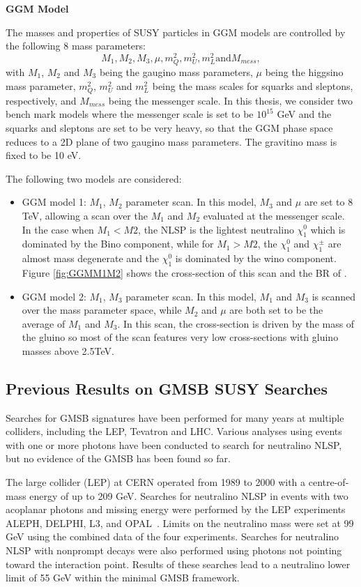 \documentclass[thesis.tex]{subfiles}
\begin{document}
\noindent \textbf{GGM Model}

The masses and properties of SUSY particles in GGM models are controlled by the following 8 mass parameters:
	\begin{equation}
		M_1, M_2, M_3, \mu, m_Q^2, m_U^2, m_L^2 \text{and} M_{mess},
	\end{equation}
with $M_1$, $M_2$ and $M_3$ being the gaugino mass parameters, $\mu$ being the higgsino mass parameter, $m_Q^2$, $m_U^2$ and $m_L^2$ being the mass scales for squarks and sleptons, respectively, and $M_{mess}$ being the messenger scale. 
In this thesis, we consider two bench mark models where the messenger scale is set to be $10^{15}$ GeV and the squarks and sleptons are set to be very heavy, so that the GGM phase space reduces to a 2D plane of two gaugino mass parameters.
The gravitino mass is fixed to be 10 eV.

The following two models are considered:
	\begin{itemize}
		\item GGM model 1: $M_1$, $M_2$ parameter scan. In this model, $M_3$ and $\mu$ are set to 8 TeV, allowing a scan over the $M_1$ and $M_2$ evaluated at the messenger scale. In the case when $M_1 < M2$, the NLSP is the lightest neutralino $\chi_1^0$ which is dominated by the Bino component, while for $M_1 > M2$, the $\chi_1^0$ and $\chi_1^\pm$ are almost mass degenerate and the $\chi_1^0$ is dominated by the wino component. Figure \ref{fig:GGMM1M2} shows the cross-section of this scan and the BR of . 
		\item GGM model 2: $M_1$, $M_3$ parameter scan. In this model, $M_1$ and $M_3$ is scanned over the mass parameter space, while $M_2$ and $\mu$ are both set to be the average of $M_1$ and $M_3$. In this scan, the cross-section is driven by the mass of the gluino so most of the scan features very low cross-sections with gluino masses above 2.5TeV. 
	\end{itemize}

\subsection{Previous Results on GMSB SUSY Searches}
Searches for GMSB signatures have been performed for many years at multiple colliders, including the LEP, Tevatron and LHC.
Various analyses using events with one or more photons have been conducted to search for neutralino NLSP, but no evidence of the GMSB has been found so far.  

The large \ePeM collider (LEP) at CERN operated from 1989 to 2000 with a centre-of-mass energy of up to 209 GeV. 
Searches for neutralino NLSP in events with two acoplanar photons and missing energy were performed by the LEP experiments ALEPH, DELPHI, L3, and OPAL~\cite{ALEPH,doi:10.1063/1.2735164,DELPHI,OPAL}.
Limits on the neutralino mass were set at 99 GeV using the combined data of the four experiments.
Searches for neutralino NLSP with nonprompt decays were also performed using photons not pointing toward the interaction point.
Results of these searches lead to a neutralino lower limit of 55 GeV within the minimal GMSB framework.
\end{document}
